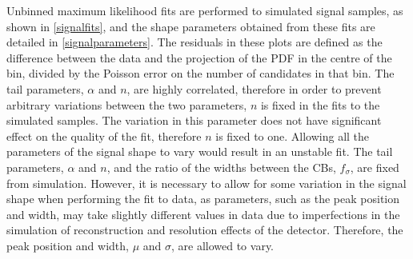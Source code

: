 Unbinned maximum likelihood fits are performed to simulated signal samples, as shown in \fig\ref{signalfits}, and the shape parameters obtained from these fits are detailed in \tab\ref{signalparameters}. The residuals in these plots are defined as the difference between the data and the projection of the PDF in the centre of the bin, divided by the Poisson error on the number of candidates in that bin. The tail parameters, $\alpha$ and $n$, are highly correlated, therefore in order to prevent arbitrary variations between the two parameters, $n$ is fixed in the fits to the simulated samples. The variation in this parameter does not have significant effect on the quality of the fit, therefore $n$ is fixed to one. Allowing all the parameters of the signal shape to vary would result in an unstable fit. The tail parameters, $\alpha$ and $n$, and the ratio of the widths between the CBs, $f_{\sigma}$, are fixed from simulation. However, it is necessary to allow for some variation in the signal shape when performing the fit to data, as parameters, such as the peak position and width, may take slightly different values in data due to imperfections in the simulation of reconstruction and resolution effects of the \lhcb detector. Therefore, the peak position and width, $\mu$ and $\sigma$, are allowed to vary.

